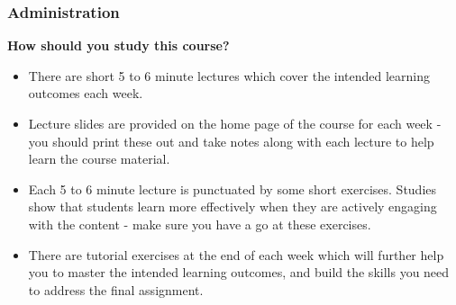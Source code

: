 \documentclass[aspectratio=169]{beamer}
\begin{document}
\begin{frame}
\frametitle{Administration}
\textbf{How should you study this course?}
\begin{itemize}
\item There are short 5 to 6 minute lectures which cover the intended learning outcomes each week.
\item Lecture slides are provided on the home page of the course for each week - you should print these out and take notes along with each lecture to help learn the course material.
\item Each 5 to 6 minute lecture is punctuated by some short exercises. Studies show that students learn more effectively when they are actively engaging with the content - make sure you have a go at these exercises.
\item There are tutorial exercises at the end of each week which will further help you to master the intended learning outcomes, and build the skills you need to address the final assignment.
\end{itemize}
\end{frame}
\end{document}
